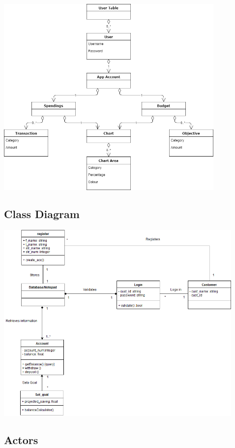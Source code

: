 \documentclass[letterpaper]{article}
\begin{document}
		\begin{center}
			\includegraphics[height=10cm]{DomainModel}
		\end{center}
	
	\newpage
	
	\subsection{Class Diagram}
	
		\begin{center}
			\includegraphics[height=10cm]{Classdiagram}
		\end{center}
	
	\newpage
	
	\subsection{Actors}
	
\end{document}
